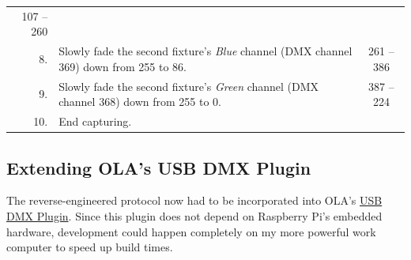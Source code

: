\begin{longtable}[]{@{}rlc@{}}
\begin{minipage}[t]{0.13\columnwidth}
107 -- 260\strut
\end{minipage}\tabularnewline
\begin{minipage}[t]{0.05\columnwidth}\raggedleft\strut
8.\strut
\end{minipage} & \begin{minipage}[t]{0.74\columnwidth}\raggedright\strut
Slowly fade the second fixture's \emph{Blue} channel (DMX channel 369)
down from 255 to 86.\strut
\end{minipage} & \begin{minipage}[t]{0.13\columnwidth}\centering\strut
261 -- 386\strut
\end{minipage}\tabularnewline
\begin{minipage}[t]{0.05\columnwidth}\raggedleft\strut
9.\strut
\end{minipage} & \begin{minipage}[t]{0.74\columnwidth}\raggedright\strut
Slowly fade the second fixture's \emph{Green} channel (DMX channel 368)
down from 255 to 0.\strut
\end{minipage} & \begin{minipage}[t]{0.13\columnwidth}\centering\strut
387 -- 224\strut
\end{minipage}\tabularnewline
\begin{minipage}[t]{0.05\columnwidth}\raggedleft\strut
10.\strut
\end{minipage} & \begin{minipage}[t]{0.74\columnwidth}\raggedright\strut
End capturing.\strut
\end{minipage} & \begin{minipage}[t]{0.13\columnwidth}\centering\strut
\strut
\end{minipage}\tabularnewline
\bottomrule
\end{longtable}

\vspace{-1.2\baselineskip}

\subsection{Extending OLA's USB DMX
Plugin}\label{extending-olas-usb-dmx-plugin}

The reverse-engineered protocol now had to be incorporated into OLA's
\protect\hyperlink{sec:ola-usb-plugin}{USB DMX Plugin}. Since this
plugin does not depend on Raspberry Pi's embedded hardware, development
could happen completely on my more powerful work computer to speed up
build times.

